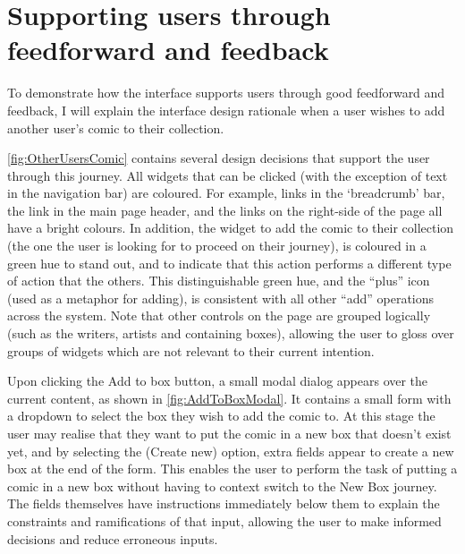 \documentclass[fontsize=12pt,a4paper]{scrreprt}
\begin{document}

\newpage
\section{Supporting users through feedforward and feedback}


To demonstrate how the interface supports users through good feedforward and feedback, I will explain the interface design rationale when a user wishes to add another user's comic to their collection.

\autoref{fig:OtherUsersComic} contains several design decisions that support the user through this journey. All widgets that can be clicked (with the exception of text in the navigation bar) are coloured. For example, links in the `breadcrumb' bar, the link in the main page header, and the links on the right-side of the page all have a bright colours. In addition, the widget to add the comic to their collection (the one the user is looking for to proceed on their journey), is coloured in a green hue to stand out, and to indicate that this action performs a different type of action that the others. This distinguishable green hue, and the ``plus'' icon (used as a metaphor for adding), is consistent with all other ``add'' operations across the system. Note that other controls on the page are grouped logically (such as the writers, artists and containing boxes), allowing the user to gloss over groups of widgets which are not relevant to their current intention.

Upon clicking the \textsf{Add to box} button, a small modal dialog appears over the current content, as shown in \autoref{fig:AddToBoxModal}. It contains a small form with a dropdown to select the box they wish to add the comic to. At this stage the user may realise that they want to put the comic in a new box that doesn't exist yet, and by selecting the \textsf{(Create new)} option, extra fields appear to create a new box at the end of the form. This enables the user to perform the task of putting a comic in a new box without having to context switch to the \textsf{New Box} journey. The fields themselves have instructions immediately below them to explain the constraints and ramifications of that input, allowing the user to make informed decisions and reduce erroneous inputs.
\end{document}
